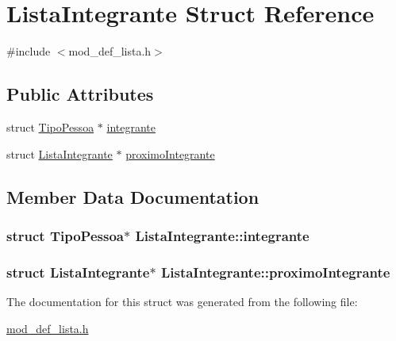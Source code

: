 \hypertarget{structListaIntegrante}{\section{Lista\+Integrante Struct Reference}
\label{structListaIntegrante}
}


{\ttfamily \#include $<$mod\+\_\+def\+\_\+lista.\+h$>$}

\subsection*{Public Attributes}
\begin{DoxyCompactItemize}
\item 
struct \hyperlink{structTipoPessoa}{Tipo\+Pessoa} $\ast$ \hyperlink{structListaIntegrante_a05ba83dff12f02edb228a56addb0c71c}{integrante}
\item 
struct \hyperlink{structListaIntegrante}{Lista\+Integrante} $\ast$ \hyperlink{structListaIntegrante_a8c9409de519cef20f9b1e596737f5ff9}{proximo\+Integrante}
\end{DoxyCompactItemize}


\subsection{Member Data Documentation}
\hypertarget{structListaIntegrante_a05ba83dff12f02edb228a56addb0c71c}{
\subsubsection[{integrante}]{\setlength{\rightskip}{0pt plus 5cm}struct {\bf Tipo\+Pessoa}$\ast$ Lista\+Integrante\+::integrante}}\label{structListaIntegrante_a05ba83dff12f02edb228a56addb0c71c}
\hypertarget{structListaIntegrante_a8c9409de519cef20f9b1e596737f5ff9}{
\subsubsection[{proximo\+Integrante}]{\setlength{\rightskip}{0pt plus 5cm}struct {\bf Lista\+Integrante}$\ast$ Lista\+Integrante\+::proximo\+Integrante}}\label{structListaIntegrante_a8c9409de519cef20f9b1e596737f5ff9}


The documentation for this struct was generated from the following file\+:\begin{DoxyCompactItemize}
\item 
\hyperlink{mod__def__lista_8h}{mod\+\_\+def\+\_\+lista.\+h}\end{DoxyCompactItemize}
